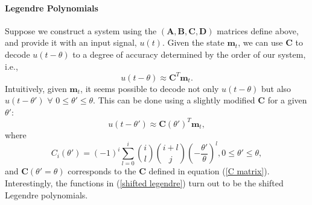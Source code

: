 \documentclass{article}
\def\vm{{\bm{m}}}
\def\mA{{\bm{A}}}
\def\mB{{\bm{B}}}
\def\mC{{\bm{C}}}
\def\mD{{\bm{D}}}
\begin{document}
\paragraph{Legendre Polynomials} Suppose we construct a system using the $(\mA, \mB, \mC, \mD)$ matrices define above, and provide it with an input signal, $u(t)$. Given the state $\vm_t$, we can use $\mC$ to decode $u(t - \theta)$ to a degree of accuracy determined by the order of our system, i.e.,
\begin{equation}
    u(t-\theta) \approx \mC^{T} \vm_t.
\end{equation}
Intuitively, given $\vm_t$, it seems possible to decode not only $u(t-\theta)$ but also $u(t-\theta') \,\, \forall  \,\, 0 \leq \theta' \leq \theta$.  This can be done using a slightly modified $\mC$ for a given $\theta'$:
\begin{equation}
    u(t-\theta') \approx \mC (\theta')^{T} \vm_t,
\end{equation}
where 
\begin{equation}
    C_{i}(\theta') = (-1)^{i} \sum_{l=0}^{i} {i \choose l} {i + l \choose j}\left(-\frac{\theta'}{\theta}\right)^{l}, 0 \leq \theta' \leq \theta, \label{shifted legendre}
\end{equation}
and $\mC(\theta' = \theta)$ corresponds to the $\mC$ defined in equation (\ref{C matrix}). Interestingly, the functions in (\ref{shifted legendre}) turn out to be the shifted Legendre polynomials. 
\end{document}
